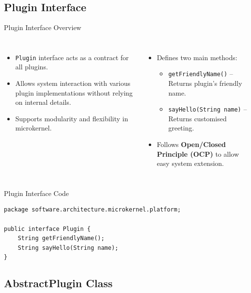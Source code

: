 \documentclass[aspectratio=169, table]{beamer}
\begin{document}
\subsection{Plugin Interface}

\begin{frame}{Plugin Interface Overview}
\vspace{20pt}
\begin{columns}[t]
\begin{itemize}
	\item \texttt{Plugin} interface acts as a contract for all plugins.
	\item Allows system interaction with various plugin implementations without relying on internal details.
	\item Supports modularity and flexibility in microkernel.
\end{itemize}
\begin{itemize}
	\item Defines two main methods:
	\begin{itemize}
		\item \texttt{getFriendlyName()} – Returns plugin's friendly name.
		\item \texttt{sayHello(String name)} – Returns customised greeting.
	\end{itemize}
	\item Follows \textbf{Open/Closed Principle (OCP)} to allow easy system extension.
\end{itemize}
\end{columns}
\end{frame}

\begin{frame}[fragile]{Plugin Interface Code}
\vspace{20pt}
\begin{lstlisting}[style=JavaStyle]
package software.architecture.microkernel.platform;

public interface Plugin {
	String getFriendlyName();
	String sayHello(String name);
}
\end{lstlisting}
\end{frame}

\subsection{AbstractPlugin Class}
\end{document}
